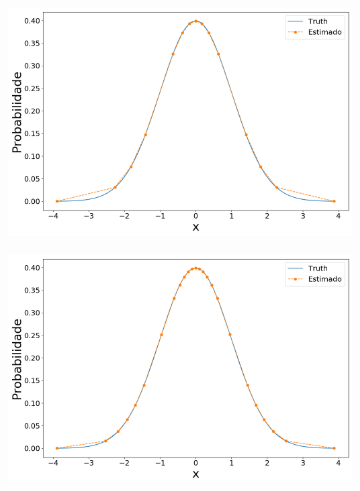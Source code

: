 \begin{figure}[H]
	\centering
	\begin{subfigure}[b]{0.45\textwidth}
		\centering 
		\includegraphics[width=\linewidth]{./figuras/iPDF2_normal_15_1_0_0}
		\caption{}
		\label{fig:ipdf2norm15}
	\end{subfigure}
	\hfill
	\begin{subfigure}[b]{0.45\textwidth}
		\centering 
		\includegraphics[width=\linewidth]{./figuras/iPDF2_normal_25_1_0_0}
		\caption{}
		\label{fig:ipdf2norm25}
	\end{subfigure}
	

\end{figure}
